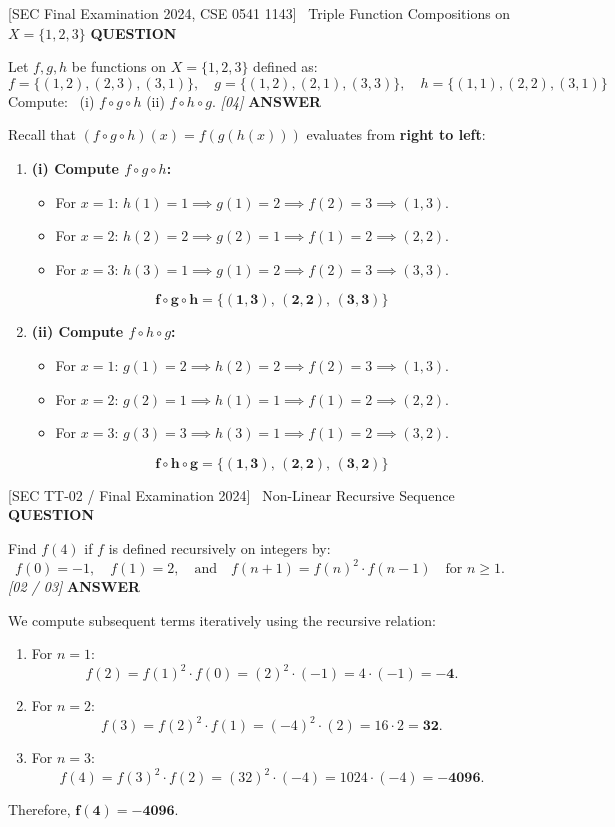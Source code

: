 \documentclass[11pt,a4paper]{article}
\newcommand{\Qlabel}{\textbf{\color{navy}\footnotesize\MakeUppercase{Question}}\par\smallskip}
\newcommand{\Alabel}{\textbf{\color{teal}\footnotesize\MakeUppercase{Answer}}\par\smallskip}
\begin{document}
\begin{exambox}{[SEC Final Examination 2024, CSE 0541 1143] \ Triple Function Compositions on $X = \{1, 2, 3\}$}
\Qlabel
Let $f, g, h$ be functions on $X = \{1, 2, 3\}$ defined as:
\[
f = \{(1, 2), (2, 3), (3, 1)\}, \quad g = \{(1, 2), (2, 1), (3, 3)\}, \quad h = \{(1, 1), (2, 2), (3, 1)\}
\]
Compute: \ (i) $f \circ g \circ h$ \qquad (ii) $f \circ h \circ g$. \hfill\textit{[04]}
\tcblower
\Alabel
Recall that $(f \circ g \circ h)(x) = f(g(h(x)))$ evaluates from \textbf{right to left}:
\begin{enumerate}
    \item \textbf{(i) Compute $f \circ g \circ h$:}
    \begin{itemize}
        \item For $x = 1$: $h(1) = 1 \implies g(1) = 2 \implies f(2) = 3 \implies (1, 3)$.
        \item For $x = 2$: $h(2) = 2 \implies g(2) = 1 \implies f(1) = 2 \implies (2, 2)$.
        \item For $x = 3$: $h(3) = 1 \implies g(1) = 2 \implies f(2) = 3 \implies (3, 3)$.
    \end{itemize}
    \[
    \mathbf{f \circ g \circ h = \big\{ (1, 3), \, (2, 2), \, (3, 3) \big\}}
    \]
    
    \item \textbf{(ii) Compute $f \circ h \circ g$:}
    \begin{itemize}
        \item For $x = 1$: $g(1) = 2 \implies h(2) = 2 \implies f(2) = 3 \implies (1, 3)$.
        \item For $x = 2$: $g(2) = 1 \implies h(1) = 1 \implies f(1) = 2 \implies (2, 2)$.
        \item For $x = 3$: $g(3) = 3 \implies h(3) = 1 \implies f(1) = 2 \implies (3, 2)$.
    \end{itemize}
    \[
    \mathbf{f \circ h \circ g = \big\{ (1, 3), \, (2, 2), \, (3, 2) \big\}}
    \]
\end{enumerate}
\end{exambox}

\begin{exambox}{[SEC TT-02 / Final Examination 2024] \ Non-Linear Recursive Sequence}
\Qlabel
Find $f(4)$ if $f$ is defined recursively on integers by:
\[
f(0) = -1, \quad f(1) = 2, \quad \text{and} \quad f(n + 1) = f(n)^2 \cdot f(n - 1) \quad \text{for } n \ge 1.
\]
\hfill\textit{[02 / 03]}
\tcblower
\Alabel
We compute subsequent terms iteratively using the recursive relation:
\begin{enumerate}
    \item For $n = 1$:
    \[
    f(2) = f(1)^2 \cdot f(0) = (2)^2 \cdot (-1) = 4 \cdot (-1) = \mathbf{-4}.
    \]
    \item For $n = 2$:
    \[
    f(3) = f(2)^2 \cdot f(1) = (-4)^2 \cdot (2) = 16 \cdot 2 = \mathbf{32}.
    \]
    \item For $n = 3$:
    \[
    f(4) = f(3)^2 \cdot f(2) = (32)^2 \cdot (-4) = 1024 \cdot (-4) = \mathbf{-4096}.
    \]
\end{enumerate}
Therefore, $\mathbf{f(4) = -4096}$.
\end{exambox}
\end{document}
